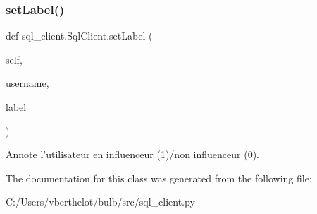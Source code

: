 \subsubsection{\texorpdfstring{set\+Label()}{setLabel()}}
{\footnotesize\ttfamily def sql\+\_\+client.\+Sql\+Client.\+set\+Label (\begin{DoxyParamCaption}\item[{}]{self,  }\item[{}]{username,  }\item[{}]{label }\end{DoxyParamCaption})}

\begin{DoxyVerb}Annote l'utilisateur en influenceur (1)/non influenceur (0).
\end{DoxyVerb}
 

The documentation for this class was generated from the following file\+:\begin{DoxyCompactItemize}
\item 
C\+:/\+Users/vberthelot/bulb/src/sql\+\_\+client.\+py\end{DoxyCompactItemize}
